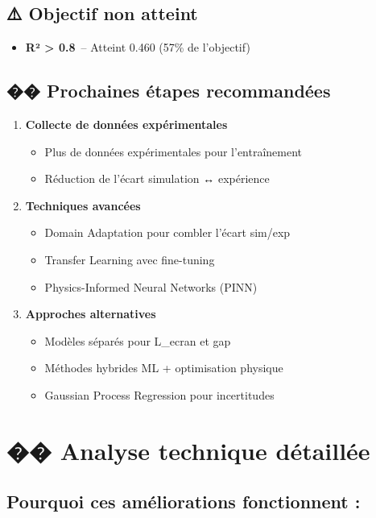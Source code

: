 \documentclass[a4paper,11pt]{article}
\begin{document}
\subsection*{⚠️ Objectif non atteint}
\begin{itemize}
  \item \textbf{R² > 0.8} \,-- Atteint 0.460 (57\% de l'objectif)
\end{itemize}

\subsection*{�� Prochaines étapes recommandées}
\begin{enumerate}
  \item \textbf{Collecte de données expérimentales}
    \begin{itemize}
      \item Plus de données expérimentales pour l'entraînement
      \item Réduction de l'écart simulation ↔ expérience
    \end{itemize}
  \item \textbf{Techniques avancées}
    \begin{itemize}
      \item Domain Adaptation pour combler l'écart sim/exp
      \item Transfer Learning avec fine-tuning
      \item Physics-Informed Neural Networks (PINN)
    \end{itemize}
  \item \textbf{Approches alternatives}
    \begin{itemize}
      \item Modèles séparés pour L\_ecran et gap
      \item Méthodes hybrides ML + optimisation physique
      \item Gaussian Process Regression pour incertitudes
    \end{itemize}
\end{enumerate}


\section*{\large �� Analyse technique détaillée}

\subsection*{Pourquoi ces améliorations fonctionnent :}
\end{document}
